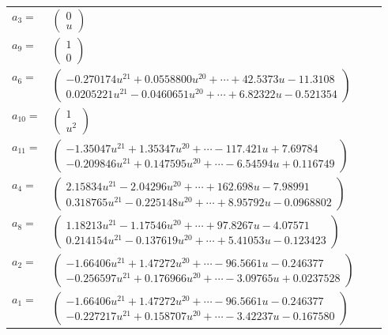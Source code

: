\documentclass[1p]{elsarticle_modified}
\theoremstyle{definition}
\begin{document}
\begin{tabular}{m{7pt} m{180pt} m{7pt} m{180pt} }
\flushright $a_{3}=$&$\begin{pmatrix}0\\u\end{pmatrix}$ \\
\flushright $a_{9}=$&$\begin{pmatrix}1\\0\end{pmatrix}$ \\
\flushright $a_{6}=$&$\begin{pmatrix}-0.270174 u^{21}+0.0558800 u^{20}+\cdots+42.5373 u-11.3108\\0.0205221 u^{21}-0.0460651 u^{20}+\cdots+6.82322 u-0.521354\end{pmatrix}$ \\
\flushright $a_{10}=$&$\begin{pmatrix}1\\u^2\end{pmatrix}$ \\
\flushright $a_{11}=$&$\begin{pmatrix}-1.35047 u^{21}+1.35347 u^{20}+\cdots-117.421 u+7.69784\\-0.209846 u^{21}+0.147595 u^{20}+\cdots-6.54594 u+0.116749\end{pmatrix}$ \\
\flushright $a_{4}=$&$\begin{pmatrix}2.15834 u^{21}-2.04296 u^{20}+\cdots+162.698 u-7.98991\\0.318765 u^{21}-0.225148 u^{20}+\cdots+8.95792 u-0.0968802\end{pmatrix}$ \\
\flushright $a_{8}=$&$\begin{pmatrix}1.18213 u^{21}-1.17546 u^{20}+\cdots+97.8267 u-4.07571\\0.214154 u^{21}-0.137619 u^{20}+\cdots+5.41053 u-0.123423\end{pmatrix}$ \\
\flushright $a_{2}=$&$\begin{pmatrix}-1.66406 u^{21}+1.47272 u^{20}+\cdots-96.5661 u-0.246377\\-0.256597 u^{21}+0.176966 u^{20}+\cdots-3.09765 u+0.0237528\end{pmatrix}$ \\
\flushright $a_{1}=$&$\begin{pmatrix}-1.66406 u^{21}+1.47272 u^{20}+\cdots-96.5661 u-0.246377\\-0.227217 u^{21}+0.158707 u^{20}+\cdots-3.42237 u-0.167580\end{pmatrix}$ \\

\end{tabular}
\end{document}
